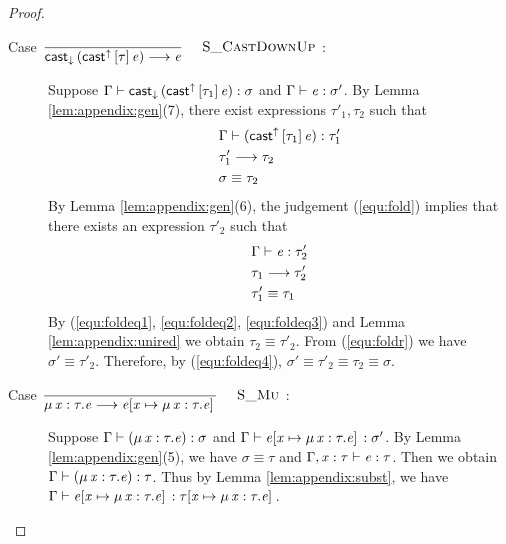 \begin{proof}
\begin{description}
        \item[Case ${\displaystyle\frac{\begin{array}{l} \end{array}}{ \mathsf{cast}_{\downarrow} \, ( \mathsf{cast}^{\uparrow} \, [ \tau ] \, \mathit{e} ) \longrightarrow \mathit{e}}\quad\textsc{ {\textsc{S\_CastDownUp}}{} }}$:] $\quad$ \\
        Suppose $\Gamma  \vdash  \mathsf{cast}_{\downarrow} \, (  \mathsf{cast}^{\uparrow} \, [  \tau_{{\mathrm{1}}}  ] \,  \mathit{e}  )  :  \sigma$ and $\Gamma  \vdash  \mathit{e}  :  \sigma'$. By Lemma \ref{lem:appendix:gen}(7), there exist expressions $\tau'_{{\mathrm{1}}}, \tau_{{\mathrm{2}}}$ such that 
        \begin{align}
            &\Gamma  \vdash  (  \mathsf{cast}^{\uparrow} \, [  \tau_{{\mathrm{1}}}  ] \,  \mathit{e}  )  :  \tau'_{{\mathrm{1}}} \label{equ:fold} \\
            &\tau'_{{\mathrm{1}}}  \longrightarrow  \tau_{{\mathrm{2}}} \label{equ:foldeq1} \\
            &\sigma  \equiv  \tau_{{\mathrm{2}}} \label{equ:foldeq4}
        \end{align}
        By Lemma \ref{lem:appendix:gen}(6), the judgement (\ref{equ:fold}) implies that there exists an expression $\tau'_{{\mathrm{2}}}$ such that
        \begin{align}
            &\Gamma  \vdash  \mathit{e}  :  \tau'_{{\mathrm{2}}} \label{equ:foldr} \\
            &\tau_{{\mathrm{1}}}  \longrightarrow  \tau'_{{\mathrm{2}}} \label{equ:foldeq2} \\
            &\tau'_{{\mathrm{1}}}  \equiv  \tau_{{\mathrm{1}}} \label{equ:foldeq3}
        \end{align}
        By (\ref{equ:foldeq1}, \ref{equ:foldeq2}, \ref{equ:foldeq3}) and Lemma \ref{lem:appendix:unired} we obtain $\tau_{{\mathrm{2}}}  \equiv  \tau'_{{\mathrm{2}}}$. From (\ref{equ:foldr}) we have $\sigma'  \equiv  \tau'_{{\mathrm{2}}}$. Therefore, by (\ref{equ:foldeq4}), $\sigma'  \equiv  \tau'_{{\mathrm{2}}}  \equiv  \tau_{{\mathrm{2}}}  \equiv  \sigma$.
        
        \item[Case ${\displaystyle\frac{\begin{array}{l} \end{array}}{ \mu \, \mathit{x} : \tau . \mathit{e} \longrightarrow \mathit{e} [ \mathit{x} \mapsto \mu \, \mathit{x} : \tau . \mathit{e} ] \,}\quad\textsc{ {\textsc{S\_Mu}}{} }}$:] $\quad$ \\
        Suppose $\Gamma  \vdash  (  \mu \, \mathit{x}  :  \tau  .  \mathit{e}  )  :  \sigma$ and $\Gamma  \vdash  \mathit{e}  [  \mathit{x}  \mapsto  \mu \, \mathit{x}  :  \tau  .  \mathit{e}  ] \,  :  \sigma'$. By Lemma \ref{lem:appendix:gen}(5), we have $\sigma  \equiv  \tau$ and $\Gamma  ,  \mathit{x}  :  \tau  \vdash  \mathit{e}  :  \tau$. Then we obtain $\Gamma  \vdash  (  \mu \, \mathit{x}  :  \tau  .  \mathit{e}  )  :  \tau$. Thus by Lemma \ref{lem:appendix:subst}, we have $\Gamma  \vdash  \mathit{e}  [  \mathit{x}  \mapsto  \mu \, \mathit{x}  :  \tau  .  \mathit{e}  ] \,  :  \tau  [  \mathit{x}  \mapsto  \mu \, \mathit{x}  :  \tau  .  \mathit{e}  ] \,$.
        

\end{description}
\end{proof}
